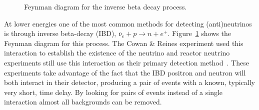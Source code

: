\begin{figure}[htbp]
\centering
\begin{feynman}
\end{feynman}
\caption[Inverse Beta Decay Feynman Diagram]{Feynman diagram for the 
inverse beta decay process.}
\label{fig:ibd}
\end{figure}
At lower energies one of the most common methods for detecting (anti)neutrinos
is through inverse beta-decay (IBD), $\overline{\nu}_{e} + p \rightarrow n + e^{+}$.
Figure~\ref{fig:ibd} shows the Feynman diagram for this process.
The Cowan \& Reines experiment used this interaction to establish the existence
of the neutrino and reactor neutrino experiments still use this interaction as
their primary detection method~\citep{double_chooz1, daya_bay, reno}.
These experiments take advantage of the fact that the IBD positron and neutron
will both interact in their detector, producing a pair
of events with a known, typically very short, time delay.
By looking for pairs of events instead of a single interaction almost
all backgrounds can be removed.

\begin{figure}[htbp]
\centering
\begin{subfigure}[b]{0.48\textwidth}
\begin{feynman}
\end{feynman}
\caption[]{}
\label{fig:nuclear_cc}
\end{subfigure}
\hfill
\begin{subfigure}[b]{0.48\textwidth}
\begin{feynman}
\end{feynman}
\caption[]{}
\label{fig:nuclear_nc}
\end{subfigure}
\caption[Neutrino Nuclear Interactions]{}
\label{fig:nuclear_interactions}
\end{figure}

